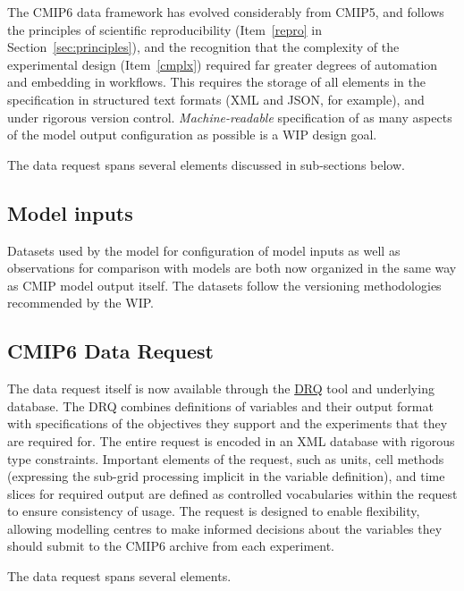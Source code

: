 \documentclass[gmd,manuscript]{copernicus}
\newcommand{\pipref}[1] {\citep{ref:#1}}
\newcommand{\secref}[1] {\mbox{Section  \ref{sec:#1}}}
\begin{document}
The CMIP6 data framework has evolved considerably from CMIP5, and
follows the principles of scientific reproducibility (Item~\ref{repro}
in \secref{principles}), and the recognition that the complexity of
the experimental design (Item~\ref{cmplx}) required far greater
degrees of automation and embedding in workflows. This requires the
storage of all elements in the specification in structured text
formats (XML and JSON, for example), and under rigorous version
control. \emph{Machine-readable} specification of as many aspects of
the model output configuration as possible is a WIP design goal.

The data request spans several elements discussed in sub-sections
below.

\subsection{Model inputs}
\label{sec:data-inputs}

Datasets used by the model for configuration of model inputs
\citep[\texttt{input4MIPs}, see][]{ref:duracketal2017} as well as
observations for comparison with models \citep[\texttt{obs4MIPs},
see][]{ref:teixeiraetal2014} are both now organized in the same way as
CMIP model output itself. The datasets follow the versioning
methodologies recommended by the WIP.

\subsection{CMIP6 Data Request}
\label{sec:data-request}

The data request itself \pipref{juckesetal2015} is now available
through the \href{https://goo.gl/iNBQ9m}{DRQ} tool and underlying
database. The DRQ combines definitions of variables and their output
format with specifications of the objectives they support and the
experiments that they are required for. The entire request is encoded
in an XML database with rigorous type constraints. Important elements
of the request, such as units, cell methods (expressing the sub-grid
processing implicit in the variable definition), and time slices for
required output are defined as controlled vocabularies within the
request to ensure consistency of usage. The request is designed to
enable flexibility, allowing modelling centres to make informed
decisions about the variables they should submit to the CMIP6 archive
from each experiment.

The data request spans several elements.
\end{document}
